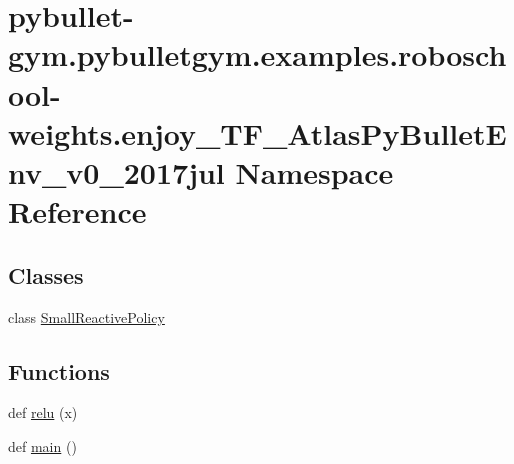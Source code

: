 \hypertarget{namespacepybullet-gym_1_1pybulletgym_1_1examples_1_1roboschool-weights_1_1enjoy___t_f___atlas_py_bullet_env__v0__2017jul}{}\section{pybullet-\/gym.pybulletgym.\+examples.\+roboschool-\/weights.enjoy\+\_\+\+T\+F\+\_\+\+Atlas\+Py\+Bullet\+Env\+\_\+v0\+\_\+2017jul Namespace Reference}
\label{namespacepybullet-gym_1_1pybulletgym_1_1examples_1_1roboschool-weights_1_1enjoy___t_f___atlas_py_bullet_env__v0__2017jul}
\subsection*{Classes}
\begin{DoxyCompactItemize}
\item 
class \hyperlink{classpybullet-gym_1_1pybulletgym_1_1examples_1_1roboschool-weights_1_1enjoy___t_f___atlas_py_bul6ed437ccb91f8c52a2d7a9247266947f}{Small\+Reactive\+Policy}
\end{DoxyCompactItemize}
\subsection*{Functions}
\begin{DoxyCompactItemize}
\item 
def \hyperlink{namespacepybullet-gym_1_1pybulletgym_1_1examples_1_1roboschool-weights_1_1enjoy___t_f___atlas_py_bullet_env__v0__2017jul_a28ddd042de6b030de5458bd0b1bf0116}{relu} (x)
\item 
def \hyperlink{namespacepybullet-gym_1_1pybulletgym_1_1examples_1_1roboschool-weights_1_1enjoy___t_f___atlas_py_bullet_env__v0__2017jul_a965b59ac1078c0abc507f7c33010dbb2}{main} ()
\end{DoxyCompactItemize}
